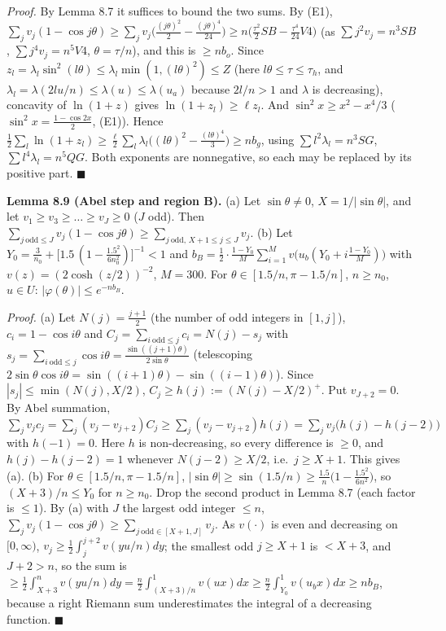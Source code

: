 \emph{Proof.} By Lemma 8.7 it suffices to bound the two sums. By (E1), \(\sum_jv_j(1-\cos j\theta)\ge\sum_jv_j\bigl(\frac{(j\theta)^2}2-\frac{(j\theta)^4}{24}\bigr)\ge n\bigl(\frac{\tau^2}2SB-\frac{\tau^4}{24}V4\bigr)\) (as \(\sum j^2v_j=n^3SB\), \(\sum j^4v_j=n^5V4\), \(\theta=\tau/n\)), and this is \(\ge nb_o\). Since \(z_l=\lambda_l\sin^2(l\theta)\le\lambda_l\min(1,(l\theta)^2)\le Z\) (here \(l\theta\le\tau\le\tau_h\), and \(\lambda_l=\lambda(2lu/n)\le\lambda(u)\le\lambda(u_a)\) because \(2l/n>1\) and \(\lambda\) is decreasing), concavity of \(\ln(1+z)\) gives \(\ln(1+z_l)\ge\ell z_l\). And \(\sin^2x\ge x^2-x^4/3\) (\(\sin^2x=\frac{1-\cos2x}2\), (E1)). Hence \(\frac12\sum_l\ln(1+z_l)\ge\frac\ell2\sum_l\lambda_l\bigl((l\theta)^2-\frac{(l\theta)^4}3\bigr)\ge nb_g\), using \(\sum l^2\lambda_l=n^3SG\), \(\sum l^4\lambda_l=n^5QG\). Both exponents are nonnegative, so each may be replaced by its positive part. \(\blacksquare\)

\textbf{Lemma 8.9 (Abel step and region B).} (a) Let \(\sin\theta\ne0\), \(X=1/|\sin\theta|\), and let \(v_1\ge v_3\ge\dots\ge v_J\ge0\) (\(J\) odd). Then \(\sum_{j\ \mathrm{odd}\le J}v_j(1-\cos j\theta)\ge\sum_{j\ \mathrm{odd},\,X+1\le j\le J}v_j\).
(b) Let \(Y_0=\frac3{n_0}+\bigl[1.5\,(1-\frac{1.5^2}{6n_0^2})\bigr]^{-1}<1\) and \(b_B=\frac12\cdot\frac{1-Y_0}{M}\sum_{i=1}^{M}v\bigl(u_b(Y_0+i\frac{1-Y_0}M)\bigr)\) with \(v(z)=(2\cosh(z/2))^{-2}\), \(M=300\). For \(\theta\in[1.5/n,\pi-1.5/n]\), \(n\ge n_0\), \(u\in U\): \(|\varphi(\theta)|\le e^{-nb_B}\).

\emph{Proof.} (a) Let \(N(j)=\frac{j+1}2\) (the number of odd integers in \([1,j]\)), \(c_i=1-\cos i\theta\) and \(C_j=\sum_{i\ \mathrm{odd}\le j}c_i=N(j)-s_j\) with \(s_j=\sum_{i\ \mathrm{odd}\le j}\cos i\theta=\frac{\sin((j+1)\theta)}{2\sin\theta}\) (telescoping \(2\sin\theta\cos i\theta=\sin((i+1)\theta)-\sin((i-1)\theta)\)). Since \(|s_j|\le\min(N(j),X/2)\), \(C_j\ge h(j):=(N(j)-X/2)^+\). Put \(v_{J+2}=0\). By Abel summation, \(\sum_jv_jc_j=\sum_j(v_j-v_{j+2})C_j\ge\sum_j(v_j-v_{j+2})h(j)=\sum_jv_j\bigl(h(j)-h(j-2)\bigr)\) with \(h(-1)=0\). Here \(h\) is non-decreasing, so every difference is \(\ge0\), and \(h(j)-h(j-2)=1\) whenever \(N(j-2)\ge X/2\), i.e.~\(j\ge X+1\). This gives (a).
(b) For \(\theta\in[1.5/n,\pi-1.5/n]\), \(|\sin\theta|\ge\sin(1.5/n)\ge\frac{1.5}n\bigl(1-\frac{1.5^2}{6n^2}\bigr)\), so \((X+3)/n\le Y_0\) for \(n\ge n_0\). Drop the second product in Lemma 8.7 (each factor is \(\le1\)). By (a) with \(J\) the largest odd integer \(\le n\), \(\sum_jv_j(1-\cos j\theta)\ge\sum_{j\ \mathrm{odd}\in[X+1,J]}v_j\). As \(v(\cdot)\) is even and decreasing on \([0,\infty)\), \(v_j\ge\frac12\int_j^{j+2}v(yu/n)dy\); the smallest odd \(j\ge X+1\) is \(<X+3\), and \(J+2>n\), so the sum is \(\ge\frac12\int_{X+3}^nv(yu/n)dy=\frac n2\int_{(X+3)/n}^1v(ux)dx\ge\frac n2\int_{Y_0}^1v(u_bx)dx\ge nb_B\), because a right Riemann sum underestimates the integral of a decreasing function. \(\blacksquare\)

